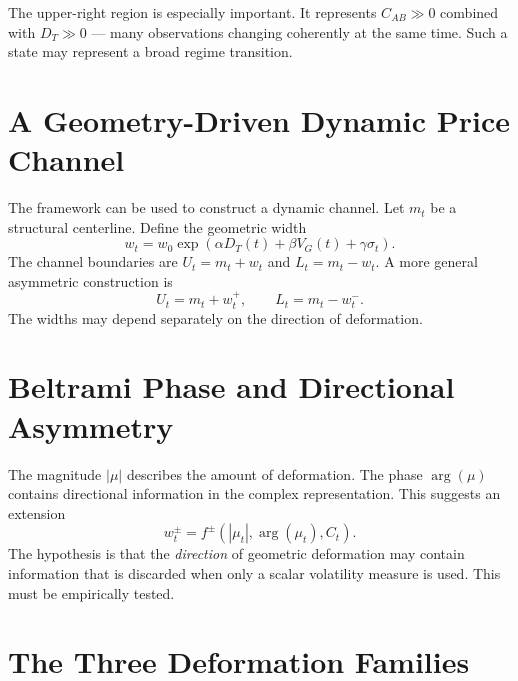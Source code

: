 \documentclass[11pt,a4paper]{article}
\numberwithin{equation}{section}
\newcommand{\abs}[1]{\left|#1\right|}
\begin{document}
The upper-right region is especially important. It represents
$C_{AB}\gg0$ combined with $D_T\gg0$ --- many observations changing
coherently at the same time. Such a state may represent a broad
regime transition.

\section{A Geometry-Driven Dynamic Price Channel}

The framework can be used to construct a dynamic channel. Let $m_t$
be a structural centerline. Define the geometric width
\begin{equation}
w_t=w_0\exp\left(\alpha D_T(t)+\beta V_G(t)+\gamma\sigma_t\right).
\label{eq:width}
\end{equation}
The channel boundaries are $U_t=m_t+w_t$ and $L_t=m_t-w_t$. A more
general asymmetric construction is
\begin{equation}
U_t=m_t+w_t^+,\qquad L_t=m_t-w_t^-.
\end{equation}
The widths may depend separately on the direction of deformation.

\section{Beltrami Phase and Directional Asymmetry}

The magnitude $\abs{\mu}$ describes the amount of deformation. The
phase $\arg(\mu)$ contains directional information in the complex
representation. This suggests an extension
\begin{equation}
w_t^\pm=f^\pm\left(\abs{\mu_t},\arg(\mu_t),C_t\right).
\end{equation}
The hypothesis is that the \emph{direction} of geometric deformation
may contain information that is discarded when only a scalar
volatility measure is used. This must be empirically tested.

\section{The Three Deformation Families}
\end{document}
